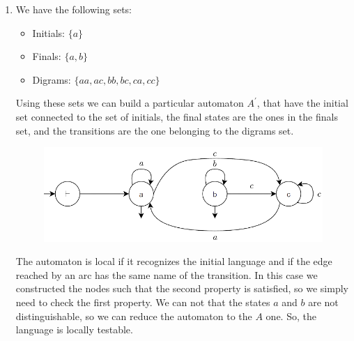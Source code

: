 \documentclass[12pt, a4paper]{report}
\newtheorem[style=M, bodystyle=\normalfont]{theorem}{Theorem}
\newtheorem[style=M, bodystyle=\normalfont]{corollary}{Corollary}
\newtheorem[style=M, bodystyle=\normalfont]{lemma}{Lemma}
\newtheorem[style=M, bodystyle=\normalfont]{definition}{Definition}
\begin{document}
\begin{enumerate}
        \item We have the following sets: 
            \begin{itemize}
                \item Initials: $\{a\}$
                \item Finals: $\{a,b\}$
                \item Digrams: $\{aa,ac,bb,bc,ca,cc\}$
            \end{itemize}
            Using these sets we can build a particular automaton $A^{'}$, that have the initial set connected to the set of initials, the final states are the ones in the finals set, and the transitions are the
            one belonging to the digrams set. 
            \begin{figure}[H]
                \centering
                \includegraphics[width=0.75\linewidth]{images/FSA6.png}
            \end{figure}
            The automaton is local if it recognizes the initial language and if the edge reached by an arc has the same name of the transition. In this case we constructed the nodes such that the second property is 
            satisfied, so we simply need to check the first property. We can not that the states $a$ and $b$ are not distinguishable, so we can reduce the automaton to the $A$ one. So, the language is locally testable. 
    \end{enumerate}

    \newpage
\end{document}
